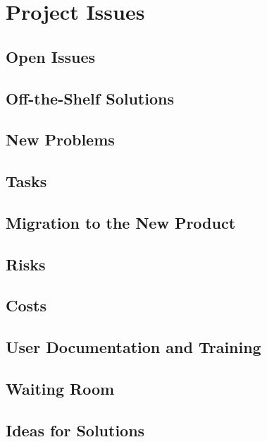\documentclass[12pt, titlepage]{article}
\begin{document}
\section{Project Issues}

\subsection{Open Issues}

\subsection{Off-the-Shelf Solutions}

\subsection{New Problems}

\subsection{Tasks}

\subsection{Migration to the New Product}

\subsection{Risks}

\subsection{Costs}

\subsection{User Documentation and Training}

\subsection{Waiting Room}

\subsection{Ideas for Solutions}




\end{document}
